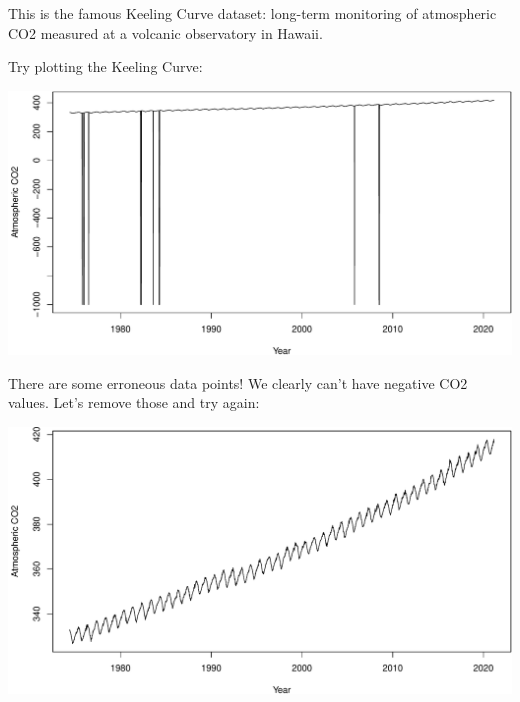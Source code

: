 \documentclass[
]{book}
\newenvironment{Shaded}{\begin{snugshade}}{\end{snugshade}}
\newcommand{\AttributeTok}[1]{\textcolor[rgb]{0.77,0.63,0.00}{#1}}
\newcommand{\DecValTok}[1]{\textcolor[rgb]{0.00,0.00,0.81}{#1}}
\newcommand{\FunctionTok}[1]{\textcolor[rgb]{0.00,0.00,0.00}{#1}}
\newcommand{\NormalTok}[1]{#1}
\newcommand{\OtherTok}[1]{\textcolor[rgb]{0.56,0.35,0.01}{#1}}
\newcommand{\SpecialCharTok}[1]{\textcolor[rgb]{0.00,0.00,0.00}{#1}}
\newcommand{\StringTok}[1]{\textcolor[rgb]{0.31,0.60,0.02}{#1}}
\begin{document}
This is the famous Keeling Curve dataset: long-term monitoring of atmospheric CO2 measured at a volcanic observatory in Hawaii.

Try plotting the Keeling Curve:

\begin{Shaded}
\end{Shaded}

\includegraphics{figures/unnamed-chunk-311-1.pdf}

There are some erroneous data points! We clearly can't have negative CO2 values. Let's remove those and try again:

\begin{Shaded}
\end{Shaded}

\includegraphics{figures/unnamed-chunk-312-1.pdf}
\end{document}
